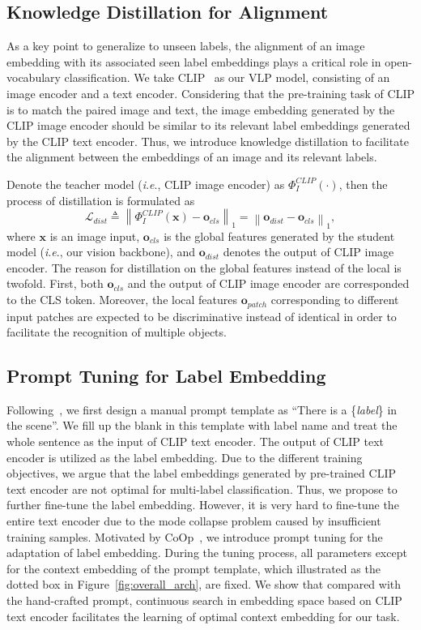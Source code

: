 \documentclass[letterpaper]{article} %
\newcommand{\ie}{\textit{i}.\textit{e}.}
\begin{document}
\subsection{Knowledge Distillation for Alignment}
As a key point to generalize to unseen labels, the alignment of an image embedding with its associated seen label embeddings plays a critical role in open-vocabulary classification.
We take CLIP~\cite{clip} as our VLP model, consisting of an image encoder and a text encoder.
Considering that the pre-training task of CLIP is to match the paired image and text, the image embedding generated by the CLIP image encoder should be similar to its relevant label embeddings generated by the CLIP text encoder.
Thus, we introduce knowledge distillation to facilitate the alignment between the embeddings of an image and its relevant labels.

Denote the teacher model (\ie, CLIP image encoder) as $\Phi_{I}^{CLIP}\left(\cdot\right)$, then the process of distillation is formulated as
\begin{equation}
\mathcal{L}_{dist} \triangleq \left\| \Phi_{I}^{CLIP}\left(\mathbf{x}\right) - \mathbf{o}_{cls} \right\|_{1} = \left\| \mathbf{o}_{dist} - \mathbf{o}_{cls} \right\|_{1},
\end{equation}
where $\mathbf{x}$ is an image input, $\mathbf{o}_{cls}$ is the global features generated by the student model (\ie, our vision backbone), and $\mathbf{o}_{dist}$ denotes the output of CLIP image encoder.
The reason for distillation on the global features instead of the local is twofold. 
First, both $\mathbf{o}_{cls}$ and the output of CLIP image encoder are corresponded to the CLS token.
Moreover, the local features $\mathbf{o}_{patch}$ corresponding to different input patches are expected to be discriminative instead of identical in order to facilitate the recognition of multiple objects.   



\subsection{Prompt Tuning for Label Embedding}
Following~\cite{clip}, we first design a manual prompt template as ``There is a \{\textit{label}\} in the scene''. 
We fill up the blank in this template with label name and treat the whole sentence as the input of CLIP text encoder.
The output of CLIP text encoder is utilized as the label embedding.
Due to the different training objectives, we argue that the label embeddings generated by pre-trained CLIP text encoder are not optimal for multi-label classification.
Thus, we propose to further fine-tune the label embedding.
However, it is very hard to fine-tune the entire text encoder due to the mode collapse problem caused by insufficient training samples.
Motivated by CoOp~\cite{coop}, we introduce prompt tuning for the adaptation of label embedding.
During the tuning process, all parameters except for the context embedding of the prompt template, which illustrated as the dotted box in Figure~\ref{fig:overall_arch}, are fixed.
We show that compared with the hand-crafted prompt, continuous search in embedding space based on CLIP text encoder facilitates the learning of optimal context embedding for our task.
\end{document}
